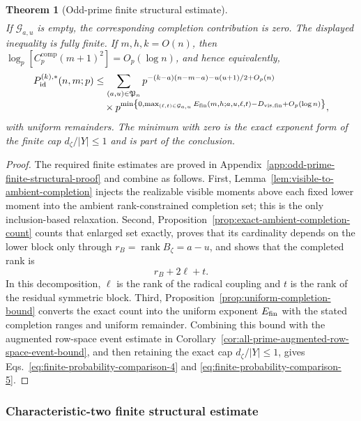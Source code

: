 \documentclass[11pt]{article}
\newcommand{\rank}{\operatorname{rank}}
\newcommand{\1}{\mathbf 1}
\theoremstyle{plain}
\newtheorem{theorem}{Theorem}[section]
\theoremstyle{definition}
\theoremstyle{remark}
\begin{document}
\begin{theorem}[Odd-prime finite structural estimate]
\begin{align}
 \label{eq:finite-probability-comparison-4}
\end{align}
If $\mathcal G_{a,u}$ is empty, the corresponding completion contribution is
zero.  The displayed inequality is fully finite.  If $m,h,k=O(n)$, then
$\log_p[C_p^{\mathrm{comp}}(m+1)^2]=O_p(\log n)$, and hence equivalently,
\begin{align}
 P_{\mathrm{id}}^{(k),*}(n,m;p)
 &\le\sum_{(a,u)\in\mathfrak P_n}
 p^{-(k-a)(n-m-a)-u(u+1)/2+O_p(n)}
 \notag\\[-1mm]
 &\quad\times
 p^{\min\left\{0,
 \max_{(\ell,t)\in\mathcal G_{a,u}}
 E_{\rm fin}(m,h;a,u,\ell,t)
 -D_{\rm vis,fin}+O_p(\log n)\right\}},
 \label{eq:finite-probability-comparison-5}
\end{align}
with uniform remainders.  The minimum with zero is the exact exponent form of
the finite cap $d_{\zeta}/\lvert Y\rvert\le1$ and is part of the conclusion.
\end{theorem}



\begin{proof}
The required finite estimates are proved in
Appendix~\ref{app:odd-prime-finite-structural-proof} and combine as follows.  First,
Lemma~\ref{lem:visible-to-ambient-completion} injects the realizable visible
moments above each fixed lower moment into the ambient rank-constrained
completion set; this is the only inclusion-based relaxation.  Second,
Proposition~\ref{prop:exact-ambient-completion-count} counts that enlarged set
exactly, proves that its cardinality depends on the lower block only through
$r_B=\rank B_\zeta=a-u$, and shows that the completed rank is
\[
 r_B+2\ell+t.
\]
In this decomposition, $\ell$ is the rank of the radical coupling and $t$ is
the rank of the residual symmetric block.  Third, Proposition~\ref{prop:uniform-completion-bound} converts the exact count
into the uniform exponent $E_{\rm fin}$ with the stated completion ranges and
uniform remainder.  Combining this bound with the augmented row-space event
estimate in Corollary~\ref{cor:all-prime-augmented-row-space-event-bound}, and
then retaining the exact cap $d_\zeta/\lvert Y\rvert\le1$, gives
Eqs.~\eqref{eq:finite-probability-comparison-4} and
\eqref{eq:finite-probability-comparison-5}.
\end{proof}

\subsubsection{Characteristic-two finite structural estimate}
\label{sec:characteristic-two-converse-input}
\end{document}
